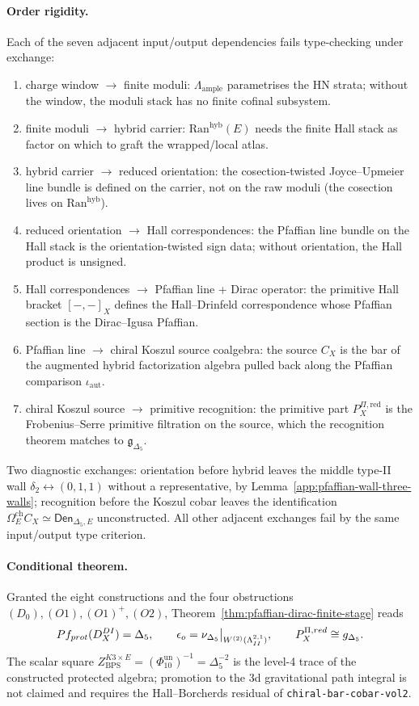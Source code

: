 \paragraph{Order rigidity.}  Each of the seven adjacent input/output
dependencies fails type-checking under exchange:
\begin{enumerate}
\item charge window $\to$ finite moduli: $\Lambda_{\mathrm{ample}}$
  parametrises the HN strata; without the window, the moduli stack
  has no finite cofinal subsystem.
\item finite moduli $\to$ hybrid carrier: $\mathrm{Ran}^{\mathrm{hyb}}(E)$
  needs the finite Hall stack as factor on which to graft the
  wrapped/local atlas.
\item hybrid carrier $\to$ reduced orientation: the cosection-twisted
  Joyce--Upmeier line bundle is defined on the carrier, not on the
  raw moduli (the cosection lives on $\mathrm{Ran}^{\mathrm{hyb}}$).
\item reduced orientation $\to$ Hall correspondences: the Pfaffian
  line bundle on the Hall stack is the orientation-twisted sign data;
  without orientation, the Hall product is unsigned.
\item Hall correspondences $\to$ Pfaffian line + Dirac operator: the
  primitive Hall bracket $[-,-]_X$ defines the Hall--Drinfeld
  correspondence whose Pfaffian section is the Dirac--Igusa Pfaffian.
\item Pfaffian line $\to$ chiral Koszul source coalgebra: the source
  $C_X$ is the bar of the augmented hybrid factorization algebra
  pulled back along the Pfaffian comparison
  $\iota_{\mathrm{aut}}$.
\item chiral Koszul source $\to$ primitive recognition: the primitive
  part $P_X^{\Pi,\mathrm{red}}$ is the Frobenius--Serre primitive
  filtration on the source, which the recognition theorem matches to
  $\mathfrak g_{\Delta_5}$.
\end{enumerate}
Two diagnostic exchanges: orientation before hybrid leaves the middle
type-II wall \(\delta_2\leftrightarrow(0,1,1)\) without a
representative, by
Lemma~\ref{app:pfaffian-wall-three-walls}; recognition before the
Koszul cobar leaves the identification
\(\Omega_E^{\mathrm{ch}}C_X\simeq\mathsf{Den}_{\Delta_5,E}\)
unconstructed.  All other adjacent exchanges fail by the same
input/output type criterion.

\paragraph{Conditional theorem.}  Granted the eight constructions and
the four obstructions \((D_0),(O1),(O1)^+,(O2)\),
Theorem~\ref{thm:pfaffian-dirac-finite-stage} reads
\[
Pf_{prot}(D_X^{DI})=\Delta_5,\qquad
\epsilon_o=\nu_{\Delta_5}\big|_{W^{(2)}(\Lambda^{2,1}_{II})},\qquad
P_X^{\Pi,red}\cong g_{\Delta_5}.
\]
The scalar square
\(Z_{\mathrm{BPS}}^{K3\times E}=
(\Phi_{10}^{\mathrm{un}})^{-1}=\Delta_5^{-2}\) is the level-4 trace
of the constructed protected algebra; promotion to the 3d
gravitational path integral is not claimed and requires the
Hall--Borcherds residual of
\texttt{chiral-bar-cobar-vol2}.

